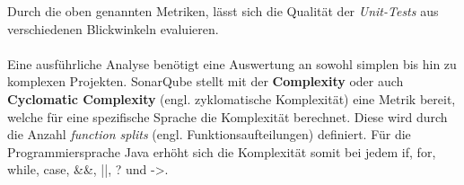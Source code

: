 Durch die oben genannten Metriken, lässt sich die Qualität der \textit{Unit-Tests} aus verschiedenen Blickwinkeln evaluieren.\\\\
Eine ausführliche Analyse benötigt eine Auswertung an sowohl simplen bis hin zu komplexen Projekten. SonarQube stellt mit der \textbf{Complexity} oder auch \textbf{Cyclomatic Complexity} (engl. zyklomatische Komplexität) eine Metrik bereit, welche für eine spezifische Sprache die Komplexität berechnet. Diese wird durch die Anzahl \textit{function splits} (engl. Funktionsaufteilungen) definiert. Für die Programmiersprache Java erhöht sich die Komplexität somit bei jedem \colorbox{gray!20}{if}, \colorbox{gray!20}{for}, \colorbox{gray!20}{while}, \colorbox{gray!20}{case}, \colorbox{gray!20}{\&\&}, \colorbox{gray!20}{||}, \colorbox{gray!20}{?} und \colorbox{gray!20}{->}. \cite*{MetricDefinition}
